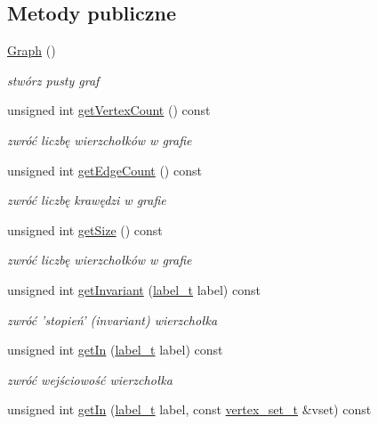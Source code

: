 \subsection*{Metody publiczne}
\begin{DoxyCompactItemize}
\item 
\hyperlink{classGraph_ae4c72b8ac4d693c49800a4c7e273654f}{Graph} ()
\begin{DoxyCompactList}\small\item\em stwórz pusty graf \end{DoxyCompactList}\item 
unsigned int \hyperlink{classGraph_a2940fa9094c860f7e4ff5b3f513c2732}{get\-Vertex\-Count} () const 
\begin{DoxyCompactList}\small\item\em zwróć liczbę wierzchołków w grafie \end{DoxyCompactList}\item 
unsigned int \hyperlink{classGraph_a5d560f48bc0d31e822ab660984a570a8}{get\-Edge\-Count} () const 
\begin{DoxyCompactList}\small\item\em zwróć liczbę krawędzi w grafie \end{DoxyCompactList}\item 
unsigned int \hyperlink{classGraph_a3aebca6e6e0d56f1beab029bdba321f4}{get\-Size} () const 
\begin{DoxyCompactList}\small\item\em zwróć liczbę wierzchołków w grafie \end{DoxyCompactList}\item 
unsigned int \hyperlink{classGraph_a35c719c0e92763e034e6519c46a1cf4b}{get\-Invariant} (\hyperlink{classGraph_a2237a0ada8484c37b8200c0e3685ca71}{label\-\_\-t} label) const 
\begin{DoxyCompactList}\small\item\em zwróć 'stopień' (invariant) wierzchołka \end{DoxyCompactList}\item 
unsigned int \hyperlink{classGraph_ab1410db4047cde674ca0f602a6eb722f}{get\-In} (\hyperlink{classGraph_a2237a0ada8484c37b8200c0e3685ca71}{label\-\_\-t} label) const 
\begin{DoxyCompactList}\small\item\em zwróć wejściowość wierzchołka \end{DoxyCompactList}\item 
unsigned int \hyperlink{classGraph_a948347b4ce0ea0f18663bb75003406d4}{get\-In} (\hyperlink{classGraph_a2237a0ada8484c37b8200c0e3685ca71}{label\-\_\-t} label, const \hyperlink{classGraph_ac91822a10fe3fc10ea8449531fc32b95}{vertex\-\_\-set\-\_\-t} \&vset) const 

\end{DoxyCompactItemize}
